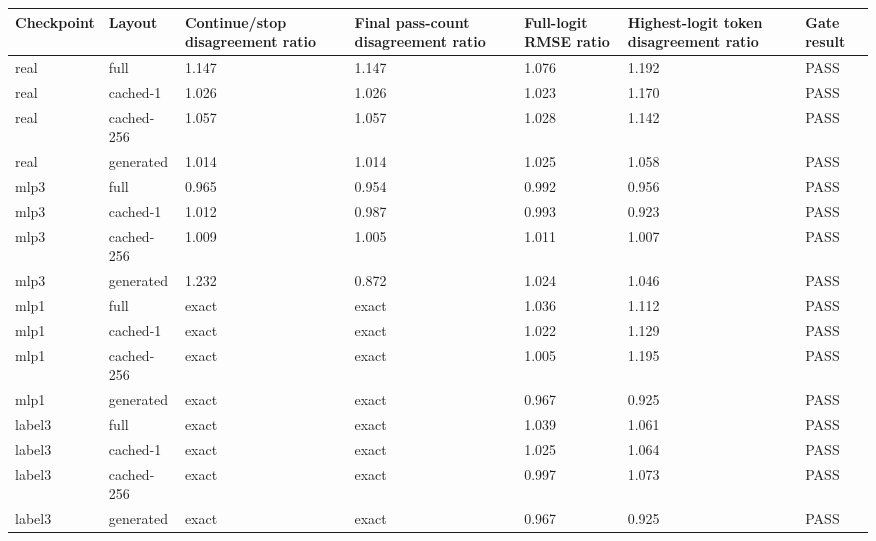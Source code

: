 \begin{tabular}{lllllll}
\toprule
Checkpoint & Layout & Continue/stop disagreement ratio & Final pass-count disagreement ratio & Full-logit RMSE ratio & Highest-logit token disagreement ratio & Gate result \\
\midrule
real & full & 1.147 & 1.147 & 1.076 & 1.192 & PASS \\
real & cached-1 & 1.026 & 1.026 & 1.023 & 1.170 & PASS \\
real & cached-256 & 1.057 & 1.057 & 1.028 & 1.142 & PASS \\
real & generated & 1.014 & 1.014 & 1.025 & 1.058 & PASS \\
mlp3 & full & 0.965 & 0.954 & 0.992 & 0.956 & PASS \\
mlp3 & cached-1 & 1.012 & 0.987 & 0.993 & 0.923 & PASS \\
mlp3 & cached-256 & 1.009 & 1.005 & 1.011 & 1.007 & PASS \\
mlp3 & generated & 1.232 & 0.872 & 1.024 & 1.046 & PASS \\
mlp1 & full & exact & exact & 1.036 & 1.112 & PASS \\
mlp1 & cached-1 & exact & exact & 1.022 & 1.129 & PASS \\
mlp1 & cached-256 & exact & exact & 1.005 & 1.195 & PASS \\
mlp1 & generated & exact & exact & 0.967 & 0.925 & PASS \\
label3 & full & exact & exact & 1.039 & 1.061 & PASS \\
label3 & cached-1 & exact & exact & 1.025 & 1.064 & PASS \\
label3 & cached-256 & exact & exact & 0.997 & 1.073 & PASS \\
label3 & generated & exact & exact & 0.967 & 0.925 & PASS \\
\bottomrule
\end{tabular}
